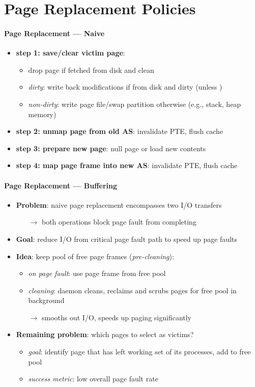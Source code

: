 \section{Page Replacement Policies}

\paragraph{Page Replacement --- Naive}
\begin{itemize}
  \item \textbf{step 1: save/clear victim page}:
  \begin{itemize}
    \item drop page if fetched from disk and clean
    \item \emph{dirty}: write back modifications if from disk and dirty (unless )
    \item \emph{non-dirty}: write page file/swap partition otherwise (e.g., stack, heap memory)
  \end{itemize}
  \item \textbf{step 2: unmap page from old AS}: invalidate PTE, flush cache
  \item \textbf{step 3: prepare new page}: null page or load new contents
  \item \textbf{step 4: map page frame into new AS}: invalidate PTE, flush cache
\end{itemize}

\paragraph{Page Replacement --- Buffering}
\begin{itemize}
  \item \textbf{Problem}: naive page replacement encompasses two I/O transfers
  \begin{itemize}
    \item[$ \to $] both operations block page fault from completing
  \end{itemize}
  \item \textbf{Goal}: reduce I/O from critical page fault path to speed up page faults
  \item \textbf{Idea}: keep pool of free page frames (\emph{pre-cleaning}):
  \begin{itemize}
    \item \emph{on page fault}: use page frame from free pool
    \item \emph{cleaning}: daemon cleans, reclaims and scrubs pages for free pool in background
    \item[$ \to $] smooths out I/O, speeds up paging significantly
  \end{itemize}
  \item \textbf{Remaining problem}: which pages to select as victims?
  \begin{itemize}
    \item \emph{goal}: identify page that has left working set of its processes, add to free pool
    \item \emph{success metric}: low overall page fault rate
  \end{itemize}
\end{itemize}

